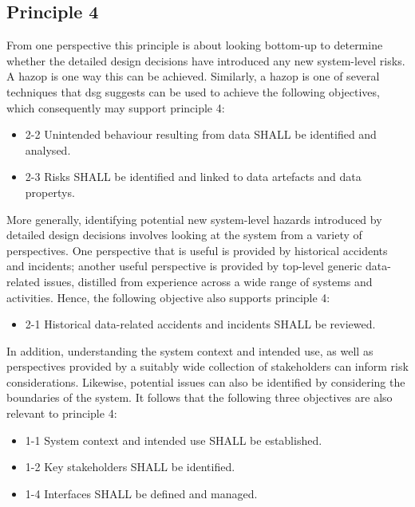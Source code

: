 \subsection{Principle 4}

From one perspective this principle is about looking bottom-up to determine whether the detailed design decisions have introduced any new system-level risks. A \gls{hazop} is one way this can be achieved. Similarly, a \gls{hazop} is one of several techniques that \gls{dsg} suggests can be used to achieve the following objectives, which consequently may support principle 4:

\begin{itemize}
	\item \textcolor{dsiwgAccentColour}{2-2} Unintended behaviour resulting from data SHALL be identified and analysed.
	\item \textcolor{dsiwgAccentColour}{2-3} Risks SHALL be identified and linked to \glspl{data artefact} and \glspl{data property}.
\end{itemize}

More generally, identifying potential new system-level hazards introduced by detailed design decisions involves looking at the system from a variety of perspectives. One perspective that is useful is provided by historical accidents and incidents; another useful perspective is provided by top-level generic data-related issues, distilled from experience across a wide range of systems and activities. Hence, the following objective also supports principle 4:

\begin{itemize}
	\item \textcolor{dsiwgAccentColour}{2-1} Historical data-related accidents and incidents SHALL be reviewed.
\end{itemize}

In addition, understanding the system context and intended use, as well as perspectives provided by a suitably wide collection of \glspl{stakeholder} can inform risk considerations. Likewise, potential issues can also be identified by considering the boundaries of the system. It follows that the following three objectives are also relevant to principle 4:

\begin{itemize}
	\item \textcolor{dsiwgAccentColour}{1-1} System context and intended use SHALL be established.
	\item \textcolor{dsiwgAccentColour}{1-2} Key \glspl{stakeholder} SHALL be identified.
	\item \textcolor{dsiwgAccentColour}{1-4} Interfaces SHALL be defined and managed.
\end{itemize}


